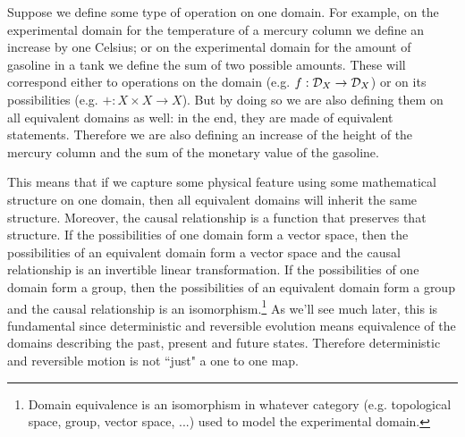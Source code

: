 \documentclass[11pt,letterpaper,fleqn]{memoir} %
\begin{document}
Suppose we define some type of operation on one domain. For example, on the experimental domain for the temperature of a mercury column we define an increase by one Celsius; or on the experimental domain for the amount of gasoline in a tank we define the sum of two possible amounts. These will correspond either to operations on the domain (e.g. $f : \mathcal{D}_X \to \mathcal{D}_X$) or on its possibilities (e.g. $+ : X \times X \to X$). But by doing so we are also defining them on all equivalent domains as well: in the end, they are made of equivalent statements. Therefore we are also defining an increase of the height of the mercury column and the sum of the monetary value of the gasoline.

This means that if we capture some physical feature using some mathematical structure on one domain, then all equivalent domains will inherit the same structure. Moreover, the causal relationship is a function that preserves that structure. If the possibilities of one domain form a vector space, then the possibilities of an equivalent domain form a vector space and the causal relationship is an invertible linear transformation. If the possibilities of one domain form a group, then the possibilities of an equivalent domain form a group and the causal relationship is an isomorphism.\footnote{Domain equivalence is an isomorphism in whatever category (e.g. topological space, group, vector space, ...) used to model the experimental domain.} As we'll see much later, this is fundamental since deterministic and reversible evolution means equivalence of the domains describing the past, present and future states. Therefore deterministic and reversible motion is not ``just" a one to one map.
\end{document}
